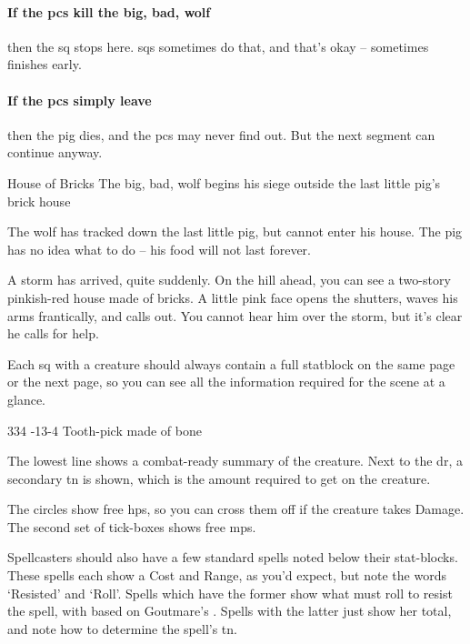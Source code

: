 \begin{multicols}{2}
\paragraph{If the \glspl{pc} kill the big, bad, wolf}
then the \gls{sq} stops here.
\Glspl{sq} sometimes do that, and that's okay -- sometimes  finishes early.

\paragraph{If the \glspl{pc} simply leave}
then the pig dies, and the \glspl{pc} may never find out.
But the next \gls{segment} can continue anyway.

{House of Bricks}%
{The big, bad, wolf begins his siege outside the last little pig's brick house}%

\begin{exampletext}
  The wolf has tracked down the last little pig, but cannot enter his house.
  The pig has no idea what to do -- his food will not last forever.
\end{exampletext}

\begin{boxtext}
  A storm has arrived, quite suddenly.
  On the hill ahead, you can see a two-story pinkish-red house made of bricks.
  A little pink face opens the shutters, waves his arms frantically, and calls out.
  You cannot hear him over the storm, but it's clear he calls for help.
\end{boxtext}

Each \gls{sq} with a creature should always contain a full statblock on the same page or the next page, so you can see all the information required for the scene at a glance.

%
  {{3}{3}{4}}%
  {{-1}{3}{-4}}%
  {%
  }%
  {}%
  {Tooth-pick made of bone}%
  {\quadruped {}}%

The lowest line shows a combat-ready summary of the creature.
Next to the \gls{dr}, a secondary \gls{tn} is shown, which is the amount required to get  on the creature.

The circles show free \glspl{hp}, so you can cross them off if the creature takes Damage.
The second set of tick-boxes shows free \glspl{mp}.

Spellcasters should also have a few standard spells noted below their stat-blocks.
These spells each show a Cost and Range, as you'd expect, but note the words `Resisted' and `Roll'.
Spells which have the former show what  must roll to resist the spell, with  based on Goutmare's .
Spells with the latter just show her  total, and note how to determine the spell's \gls{tn}.


\end{multicols}
